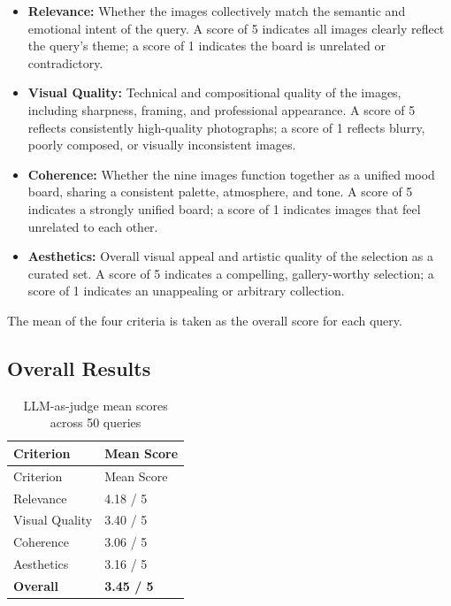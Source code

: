 \documentclass[
  11pt,
]{article}
\providecommand{\tightlist}{%
  \setlength{\itemsep}{0pt}\setlength{\parskip}{0pt}}\usepackage{longtable,booktabs,array}
\begin{document}
\begin{itemize}
\tightlist
\item
  \textbf{Relevance:} Whether the images collectively match the semantic
  and emotional intent of the query. A score of 5 indicates all images
  clearly reflect the query's theme; a score of 1 indicates the board is
  unrelated or contradictory.
\item
  \textbf{Visual Quality:} Technical and compositional quality of the
  images, including sharpness, framing, and professional appearance. A
  score of 5 reflects consistently high-quality photographs; a score of
  1 reflects blurry, poorly composed, or visually inconsistent images.
\item
  \textbf{Coherence:} Whether the nine images function together as a
  unified mood board, sharing a consistent palette, atmosphere, and
  tone. A score of 5 indicates a strongly unified board; a score of 1
  indicates images that feel unrelated to each other.
\item
  \textbf{Aesthetics:} Overall visual appeal and artistic quality of the
  selection as a curated set. A score of 5 indicates a compelling,
  gallery-worthy selection; a score of 1 indicates an unappealing or
  arbitrary collection.
\end{itemize}

The mean of the four criteria is taken as the overall score for each
query.

\subsection{Overall Results}\label{overall-results}

\begin{longtable}[]{@{}ll@{}}
\caption{LLM-as-judge mean scores across 50
queries}\label{tbl-overall-results}\tabularnewline
\toprule\noalign{}
Criterion & Mean Score \\
\midrule\noalign{}
\endfirsthead
\toprule\noalign{}
Criterion & Mean Score \\
\midrule\noalign{}
\endhead
\bottomrule\noalign{}
\endlastfoot
Relevance & 4.18 / 5 \\
Visual Quality & 3.40 / 5 \\
Coherence & 3.06 / 5 \\
Aesthetics & 3.16 / 5 \\
\textbf{Overall} & \textbf{3.45 / 5} \\
\end{longtable}
\end{document}
